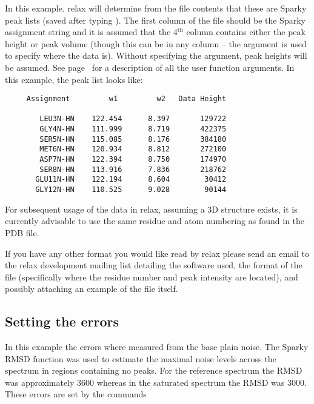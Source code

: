 In this example, relax will determine from the file contents that these are Sparky peak lists (saved after typing ).  The first column of the file should be the Sparky assignment string and it is assumed that the 4$^\textrm{th}$ column contains either the peak height or peak volume (though this can be in any column -- the  argument is used to specify where the data is).  Without specifying the  argument, peak heights will be assumed.  See page~\pageref{uf: spectrum.read_intensities} for a description of all the  user function arguments.  In this example, the peak list looks like:

{\footnotesize \begin{verbatim}
     Assignment         w1         w2   Data Height

        LEU3N-HN    122.454      8.397       129722
        GLY4N-HN    111.999      8.719       422375
        SER5N-HN    115.085      8.176       384180
        MET6N-HN    120.934      8.812       272100
        ASP7N-HN    122.394      8.750       174970
        SER8N-HN    113.916      7.836       218762
       GLU11N-HN    122.194      8.604        30412
       GLY12N-HN    110.525      9.028        90144
\end{verbatim}}

For subsequent usage of the data in relax, assuming a 3D structure exists, it is currently advisable to use the same residue and atom numbering as found in the PDB file.

If you have any other format you would like read by relax please send an email to the relax development mailing list detailing the software used, the format of the file (specifically where the residue number and peak intensity are located), and possibly attaching an example of the file itself.




\subsection{Setting the errors}

In this example the errors where measured from the base plain noise.  The Sparky RMSD function was used to estimate the maximal noise levels across the spectrum in regions containing no peaks.  For the reference spectrum the RMSD was approximately 3600 whereas in the saturated spectrum the RMSD was 3000.  These errors are set by the commands

